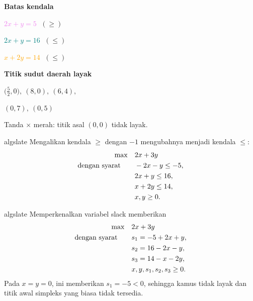 \begin{center}
\begin{minipage}[t]{0.56\linewidth}
\end{minipage}\hfill
\begin{minipage}[t]{0.40\linewidth}
\small
\textbf{Batas kendala}\par\smallskip
\textcolor{violet}{\(2x+y=5\)} \(\;(\ge)\)\par
\textcolor{teal}{\(2x+y=16\)} \(\;(\le)\)\par
\textcolor{orange}{\(x+2y=14\)} \(\;(\le)\)\par
\medskip
\textbf{Titik sudut daerah layak}\par\smallskip
\(\bigl(\tfrac52,0\bigr),\ (8,0),\ (6,4),\)\par
\((0,7),\ (0,5)\)\par
\medskip
\textcolor{red!70!black}{Tanda \(\times\) merah: titik asal \((0,0)\) tidak layak.}
\end{minipage}

\label{fig:simplex-basis-driven-tikz10}%

\end{center}


\begin{steppanel}{algslate}
 Mengalikan kendala $\ge$ dengan $-1$ mengubahnya menjadi kendala $\le$:
\[
\begin{aligned}
\max\quad & 2x + 3y \\
\mbox{dengan syarat}\quad\quad & -2x - y \leq -5, \\
& 2x + y \leq 16, \\
& x + 2y \leq 14, \\
& x, y \geq 0.
\end{aligned}
\]
\end{steppanel}

\begin{steppanel}{algslate}
 Memperkenalkan variabel slack memberikan
\[
\begin{aligned}
\max\quad & 2x + 3y \\
\mbox{dengan syarat}\quad\quad & s_1 = -5 + 2x + y,\\
& s_2 = 16 - 2x - y,\\
& s_3 = 14 - x - 2y,\\
& x, y, s_1, s_2, s_3 \ge 0.
\end{aligned}
\]
Pada $x=y=0$, ini memberikan $s_1=-5<0$, sehingga kamus tidak layak dan titik awal simpleks yang biasa tidak tersedia.
\end{steppanel}

